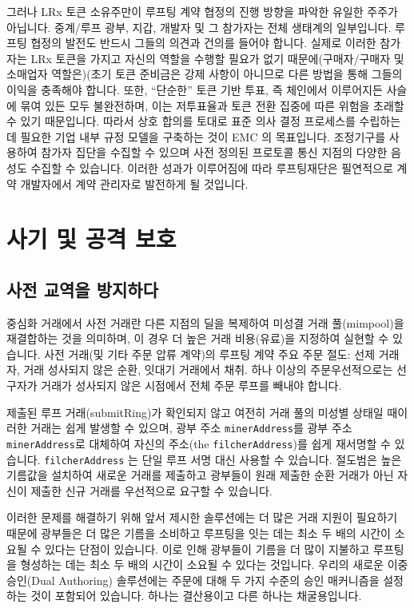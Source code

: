 \documentclass{article}
\begin{document}
\begin{multicols}{2}
\indent 그러나 LRx 토큰 소유주만이 루프팅 계약 협정의 진행 방향을 파악한 유일한 주주가 아닙니다. 중계/루프 광부, 지갑, 개발자 및 그 참가자는 전체 생태계의 일부입니다. 루프팅 협정의 발전도 반드시 그들의 의견과 건의를 들어야 합니다. 실제로 이러한 참가자는 LRx 토큰을 가지고 자신의 역할을 수행할 필요가 없기 때문에(구매자/구매자 및 소매업자 역할은)(초기 토큰 준비금은 강제 사항이 아니므로 다른 방법을 통해 그들의 이익을 충족해야 합니다. 또한, “단순한” 토큰 기반 투표, 즉 체인에서 이루어지든 사슬에 묶여 있든 모두 불완전하며, 이는 저투표율과 토큰 전환 집중에 따른 위험을 초래할 수 있기 때문입니다. 따라서 상호 합의를 토대로 표준 의사 결정 프로세스를 수립하는 데 필요한 기업 내부 규정 모델을 구축하는 것이 EMC 의 목표입니다. 조정기구를 사용하여 참가자 집단을 수집할 수 있으며 사전 정의된 프로토콜 통신 지점의 다양한 음성도 수집할 수 있습니다. 이러한 성과가 이루어짐에 따라 루프팅재단은 필연적으로 계약 개발자에서 계약 관리자로 발전하게 될 것입니다.

\section{사기 및 공격 보호}
\subsection{사전 교역을 방지하다\label{sec:dual_authoring}}

\indent 중심화 거래에서 사전 거래란 다른 지점의 딜을 복제하여 미성결 거래 풀(mimpool)을 재결합하는 것을 의미하며, 이 경우 더 높은 거래 비용(유료)을 지정하여 실현할 수 있습니다. 사전 거래(및 기타 주문 압류 계약)의 루프팅 계약 주요 주문 절도: 선제 거래자, 거래 성사되지 않은 순환, 잇대기 거래에서 채취. 하나 이상의 주문우선적으로는 선구자가 거래가 성사되지 않은 시점에서 전체 주문 루프를 빼내야 합니다.


\indent 제출된 루프 거래(submitRing)가 확인되지 않고 여전히 거래 풀의 미성별 상태일 때이러한 거래는 쉽게 발생할 수 있으며, 광부 주소 \verb|minerAddress|를 광부 주소 \verb|minerAddress|로 대체하여 자신의 주소(the \verb|filcherAddress|)를 쉽게 재서명할 수 있습니다. \verb|filcherAddress| 는 단일 루프 서명 대신 사용할 수 있습니다. 절도범은 높은 기름값을 설치하여 새로운 거래를 제출하고 광부들이 원래 제출한 순환 거래가 아닌 자신이 제출한 신규 거래를 우선적으로 요구할 수 있습니다.

\indent 이러한 문제를 해결하기 위해 앞서 제시한 솔루션에는 더 많은 거래 지원이 필요하기 때문에 광부들은 더 많은 기름을 소비하고 루프팅을 잇는 데는 최소 두 배의 시간이 소요될 수 있다는 단점이 있습니다. 이로 인해 광부들이 기름을 더 많이 지불하고 루프팅을 형성하는 데는 최소 두 배의 시간이 소요될 수 있다는 것입니다. 우리의 새로운 이중 승인(Dual Authoring) 솔루션에는 주문에 대해 두 가지 수준의 승인 매커니즘을 설정하는 것이 포함되어 있습니다. 하나는 결산용이고 다른 하나는 채굴용입니다.



\end{multicols}
\end{document}
